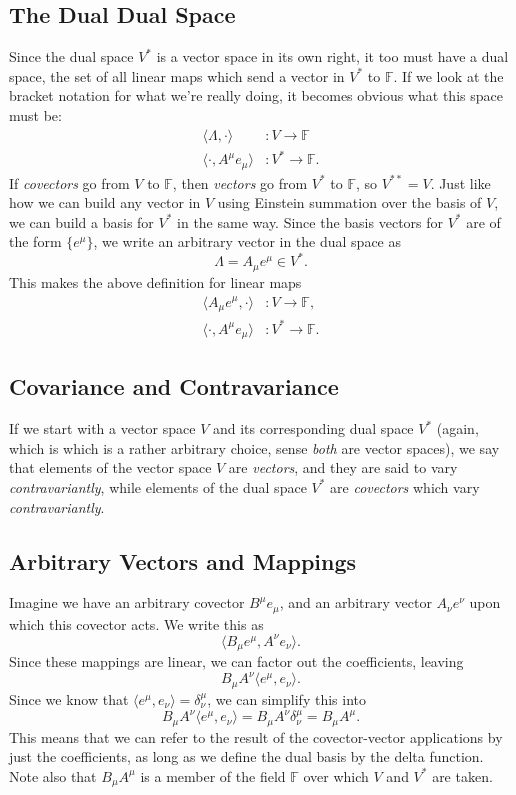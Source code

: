 \subsection{The Dual Dual Space}
Since the dual space $V^*$ is a vector space in its own right, it too must have a dual space, the set of all linear maps which send a vector in $V^*$ to $\mathbb{F}$.
If we look at the bracket notation for what we're really doing, it becomes obvious what this space must be:
\begin{align*}
    \langle \Lambda, \cdot \rangle &: V \to \mathbb{F} \\
    \langle \cdot, A^\mu e_\mu \rangle &: V^* \to \mathbb{F}.
\end{align*}
If \emph{covectors} go from $V$ to $\mathbb{F}$, then \emph{vectors} go from $V^*$ to $\mathbb{F}$, so $V^{**} = V$.
Just like how we can build any vector in $V$ using Einstein summation over the basis of $V$, we can build a basis for $V^*$ in the same way. Since the basis vectors for $V^*$ are of the form $\{e^\mu\}$, we write an arbitrary vector in the dual space as
\[ \Lambda = A_\mu e^\mu \in V^*. \]
This makes the above definition for linear maps
\begin{align*}
    \langle A_\mu e^\mu, \cdot \rangle &: V \to \mathbb{F}, \\
    \langle \cdot, A^\mu e_\mu \rangle &: V^* \to \mathbb{F}.
\end{align*}

\subsection{Covariance and Contravariance}
If we start with a vector space $V$ and its corresponding dual space $V^*$ (again, which is which is a rather arbitrary choice, sense \emph{both} are vector spaces), we say that elements of the vector space $V$ are \emph{vectors}, and they are said to vary \emph{contravariantly}, while elements of the dual space $V^*$ are \emph{covectors} which vary \emph{contravariantly}.

\subsection{Arbitrary Vectors and Mappings}
Imagine we have an arbitrary covector $B^\mu e_\mu$, and an arbitrary vector $A_\nu e^\nu$ upon which this covector acts. We write this as 
\[ \langle B_\mu e^\mu, A^\nu e_\nu \rangle. \]
Since these mappings are linear, we can factor out the coefficients, leaving
\[ B_\mu A^\nu \langle e^\mu, e_\nu \rangle. \]
Since we know that $\langle e^\mu, e_\nu \rangle = \delta^\mu_\nu$, we can simplify this into
\[ B_\mu A^\nu \langle e^\mu, e_\nu \rangle = B_\mu A^\nu \delta^\mu_\nu = B_\mu A^\mu. \]
This means that we can refer to the result of the covector-vector applications by just the coefficients, as long as we define the dual basis by the delta function.
Note also that $B_\mu A^\mu$ is a member of the field $\mathbb{F}$ over which $V$ and $V^*$ are taken.